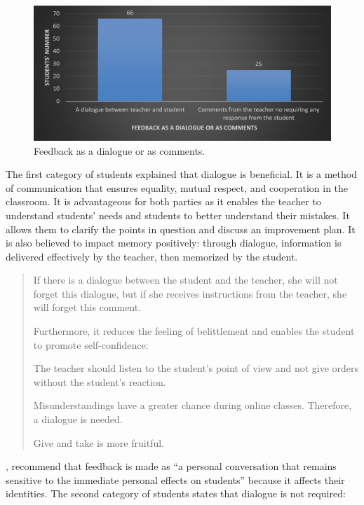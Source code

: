 \documentclass[english]{textolivre}
\begin{document}
\begin{figure}[h!]
 \centering
 \begin{minipage}{.85\textwidth}
 \includegraphics[width=\textwidth]{17.jpg}
 \caption{Feedback as a dialogue or as comments.}
 \label{fig17}
 \end{minipage}
\end{figure}

The first category of students explained that dialogue is beneficial. It is a method of communication that ensures equality, mutual respect, and cooperation in the classroom. It is advantageous for both parties as it enables the teacher to understand students’ needs and students to better understand their mistakes. It allows them to clarify the points in question and discuss an improvement plan. It is also believed to impact memory positively: through dialogue, information is delivered effectively by the teacher, then memorized by the student.

\begin{quote}
    If there is a dialogue between the student and the teacher, she will not forget this dialogue, but if she receives instructions from the teacher, she will forget this comment.
    
Furthermore, it reduces the feeling of belittlement and enables the student to promote self-confidence:

The teacher should listen to the student's point of view and not give orders without the student's reaction.

Misunderstandings have a greater chance during online classes. Therefore, a dialogue is needed.

Give and take is more fruitful.
\end{quote}

\textcite[p. 6]{torres_interpreting_2016}, recommend that feedback is made as “a personal conversation that remains sensitive to the immediate personal effects on students” because it affects their identities. The second category of students states that dialogue is not required:
\end{document}

